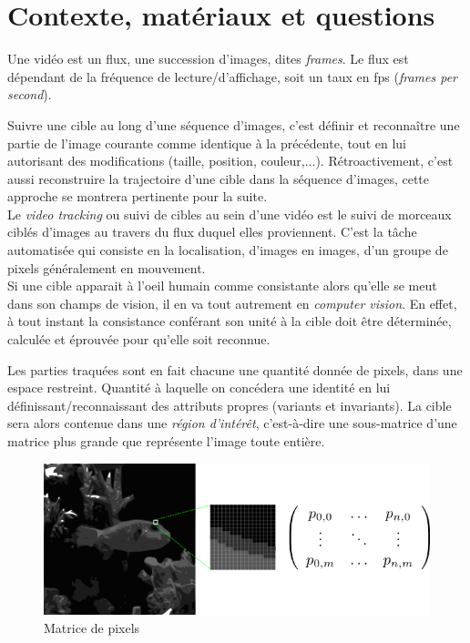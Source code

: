 \documentclass[a4paper,11pt]{report}
\begin{document}
\section{Contexte, matériaux et questions}
Une vidéo est un flux, une succession d'images, dites  \textit{frames}. Le flux est dépendant de la fréquence de lecture/d'affichage, soit un taux en fps (\textit{frames per second}). 

Suivre une cible au long d'une séquence d'images, c'est définir et reconnaître une partie de l'image courante comme identique à la précédente, tout en lui autorisant des modifications (taille, position, couleur,...). Rétroactivement, c'est aussi reconstruire la trajectoire d'une cible dans la séquence d'images, cette approche se montrera pertinente pour la suite.\\

Le \textit{video tracking} ou suivi de cibles au sein d'une vidéo est le suivi de morceaux ciblés d'images au travers du flux duquel elles proviennent. C'est la tâche automatisée qui consiste en la localisation, d'images en images, d'un groupe de pixels généralement en mouvement. \\

Si une cible apparait à l'oeil humain comme consistante alors qu'elle se meut dans son champs de vision, il en va tout autrement en \textit{computer vision}. En effet, à tout instant la consistance conférant son unité à la cible doit être déterminée, calculée et éprouvée pour qu'elle soit reconnue. 

Les parties traquées sont en fait chacune une quantité donnée de pixels, dans une espace restreint. Quantité à laquelle on concédera une identité en lui définissant/reconnaissant des attributs propres (variants et invariants). La cible sera alors contenue dans une \textit{région d'intérêt}, c'est-à-dire une sous-matrice d'une matrice plus grande que représente l'image toute entière.\\

\begin{figure}[hbtp]
\centering
\includegraphics[scale=1]{figureImageMatrice.png}
\caption{Matrice de pixels}
\end{figure}
\end{document}
